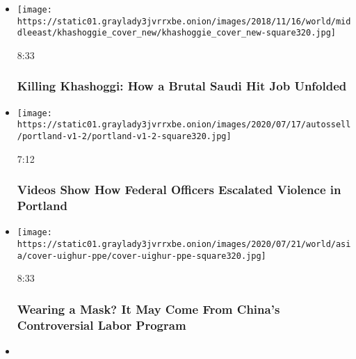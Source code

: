 \begin{itemize}
\item
  \href{https://www.nytimes3xbfgragh.onion/video/world/middleeast/100000006154117/khashoggi-istanbul-death-saudi-consulate.html?action=click\&module=video-series-bar\&region=header\&pgtype=Article\&playlistId=video/investigations}{}

  \texttt{[image: https://static01.graylady3jvrrxbe.onion/images/2018/11/16/world/middleeast/khashoggie\_cover\_new/khashoggie\_cover\_new-square320.jpg]}

  8:33

  \hypertarget{killing-khashoggi-how-a-brutal-saudi-hit-job-unfolded}{%
  \subsubsection{Killing Khashoggi: How a Brutal Saudi Hit Job
  Unfolded}\label{killing-khashoggi-how-a-brutal-saudi-hit-job-unfolded}}
\item
  \href{https://www.nytimes3xbfgragh.onion/video/us/100000007243995/portland-protests-federal-government.html?action=click\&module=video-series-bar\&region=header\&pgtype=Article\&playlistId=video/investigations}{}

  \texttt{[image: https://static01.graylady3jvrrxbe.onion/images/2020/07/17/autossell/portland-v1-2/portland-v1-2-square320.jpg]}

  7:12

  \hypertarget{videos-show-how-federal-officers-escalated-violence-in-portland}{%
  \subsubsection{Videos Show How Federal Officers Escalated Violence in
  Portland}\label{videos-show-how-federal-officers-escalated-violence-in-portland}}
\item
  \href{https://www.nytimes3xbfgragh.onion/video/world/asia/100000007226041/china-coronavirus-masks-uighur-labor-ppe.html?action=click\&module=video-series-bar\&region=header\&pgtype=Article\&playlistId=video/investigations}{}

  \texttt{[image: https://static01.graylady3jvrrxbe.onion/images/2020/07/21/world/asia/cover-uighur-ppe/cover-uighur-ppe-square320.jpg]}

  8:33

  \hypertarget{wearing-a-mask-it-may-come-from-chinas-controversial-labor-program}{%
  \subsubsection{Wearing a Mask? It May Come From China's Controversial
  Labor
  Program}\label{wearing-a-mask-it-may-come-from-chinas-controversial-labor-program}}
\item
  \href{https://www.nytimes3xbfgragh.onion/video/us/100000007122997/ice-deportations-coronavirus-video.html?action=click\&module=video-series-bar\&region=header\&pgtype=Article\&playlistId=video/investigations}{}


\end{itemize}
